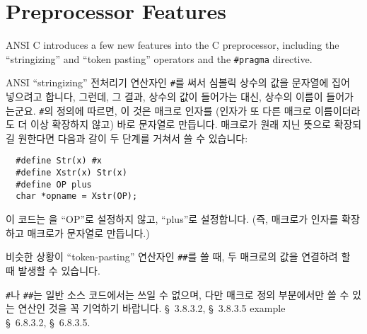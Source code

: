\section{Preprocessor Features}
ANSI C introduces a few new features into the C preprocessor, including
the ``stringizing'' and ``token pasting'' operators and the \verb+#pragma+
directive.

\begin{faq}
	ANSI ``stringizing'' 전처리기 연산자인 \verb+#+를 써서 심볼릭
	상수의 값을 문자열에 집어 넣으려고 합니다, 그런데,
	그 결과, 상수의 값이 들어가는 대신, 상수의 이름이 들어가는군요.
\A
	\verb+#+의 정의에 따르면, 이 것은 매크로 인자를 
        (인자가 또 다른 매크로 이름이더라도 더 이상 확장하지 않고)
        바로 문자열로 만듭니다.
	매크로가 원래 지닌 뜻으로 확장되길 원한다면 다음과 갈이 
	두 단계를 거쳐서 쓸 수 있습니다:
\begin{verbatim}
  #define Str(x) #x
  #define Xstr(x) Str(x)
  #define OP plus
  char *opname = Xstr(OP);
\end{verbatim}
	이 코드는 을 ``OP''로 설정하지 않고, ``plus''로
	설정합니다. (즉,  매크로가 인자를 확장하고 
          매크로가 문자열로 만듭니다.)

	비슷한 상황이 ``token-pasting'' 연산자인 \verb+##+를 쓸 때,
	두 매크로의 값을 연결하려 할 때	발생할 수 있습니다.

        \verb+#+나 \verb+##+는 일반 소스 코드에서는 쓰일 수 없으며,
        다만 매크로 정의 부분에서만 쓸 수 있는 연산인 것을 꼭 기억하기
        바랍니다.
\R
	\cite{ansi} \S\ 3.8.3.2, \S\ 3.8.3.5 example \\
	\cite{c89} \S\ 6.8.3.2, \S\ 6.8.3.5.
\end{faq}

